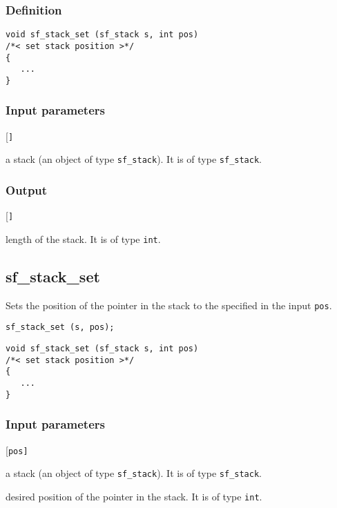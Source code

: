 \subsubsection*{Definition}
\begin{verbatim}
void sf_stack_set (sf_stack s, int pos) 
/*< set stack position >*/
{
   ...
}
\end{verbatim}

\subsubsection*{Input parameters}
\begin{desclist}{\tt }{\quad}[\tt ]
   \setlength\itemsep{0pt}
   \item[s] a stack (an object of type \texttt{sf\_stack}). It is of type \texttt{sf\_stack}.
\end{desclist}

\subsubsection*{Output}
\begin{desclist}{\tt }{\quad}[\tt ]
   \setlength\itemsep{0pt}
   \item[s->top - s->entry] length of the stack. It is of type \texttt{int}.
\end{desclist}




\subsection{{sf\_stack\_set}}
Sets the position of the pointer in the stack to the specified in the input \texttt{pos}.

\begin{verbatim}sf_stack_set (s, pos);\end{verbatim}

\begin{verbatim}
void sf_stack_set (sf_stack s, int pos) 
/*< set stack position >*/
{
   ...
}
\end{verbatim}

\subsubsection*{Input parameters}
\begin{desclist}{\tt }{\quad}[\tt pos]
   \setlength\itemsep{0pt}
   \item[s]   a stack (an object of type \texttt{sf\_stack}). It is of type \texttt{sf\_stack}. 
   \item[pos] desired position of the pointer in the stack. It is of type \texttt{int}.
\end{desclist}




